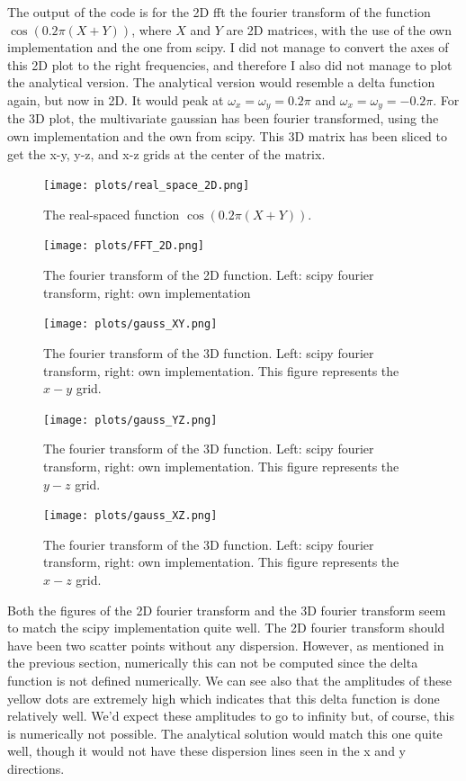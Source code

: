 
The output of the code is for the 2D fft the fourier transform of the function $\cos(0.2\pi(X+Y))$, where $X$ and $Y$ are 2D matrices, with the use of the own implementation and the one from scipy. I did not manage to convert the axes of this 2D plot to the right frequencies, and therefore I also did not manage to plot the analytical version. The analytical version would resemble a delta function again, but now in 2D. It would peak at $\omega_x = \omega_y = 0.2\pi$ and $\omega_x = \omega_y = -0.2\pi$. For the 3D plot, the multivariate gaussian has been fourier transformed, using the own implementation and the own from scipy. This 3D matrix has been sliced to get the x-y, y-z, and x-z grids at the center of the matrix.
\begin{figure}[h]
\centering
\texttt{[image: plots/real\_space\_2D.png]}
\caption{The real-spaced function $\cos(0.2\pi(X+Y))$.}
\end{figure}
\begin{figure}[h]
\centering
\texttt{[image: plots/FFT\_2D.png]}
\caption{The fourier transform of the 2D function. Left: scipy fourier transform, right: own implementation}
\end{figure}
\begin{figure}[h]
\centering
\texttt{[image: plots/gauss\_XY.png]}
\caption{The fourier transform of the 3D function. Left: scipy fourier transform, right: own implementation. This figure represents the $x-y$ grid.}
\end{figure}
\begin{figure}[h]
\centering
\texttt{[image: plots/gauss\_YZ.png]}
\caption{The fourier transform of the 3D function. Left: scipy fourier transform, right: own implementation. This figure represents the $y-z$ grid.}
\end{figure}
\begin{figure}[h]
\centering
\texttt{[image: plots/gauss\_XZ.png]}
\caption{The fourier transform of the 3D function. Left: scipy fourier transform, right: own implementation. This figure represents the $x-z$ grid.}
\end{figure}

Both the figures of the 2D fourier transform and the 3D fourier transform seem to match the scipy implementation quite well. The 2D fourier transform should have been two scatter points without any dispersion. However, as mentioned in the previous section, numerically this can not be computed since the delta function is not defined numerically. We can see also that the amplitudes of these yellow dots are extremely high which indicates that this delta function is done relatively well. We'd expect these amplitudes to go to infinity but, of course, this is numerically not possible. The analytical solution would match this one quite well, though it would not have these dispersion lines seen in the x and y directions. 
\clearpage